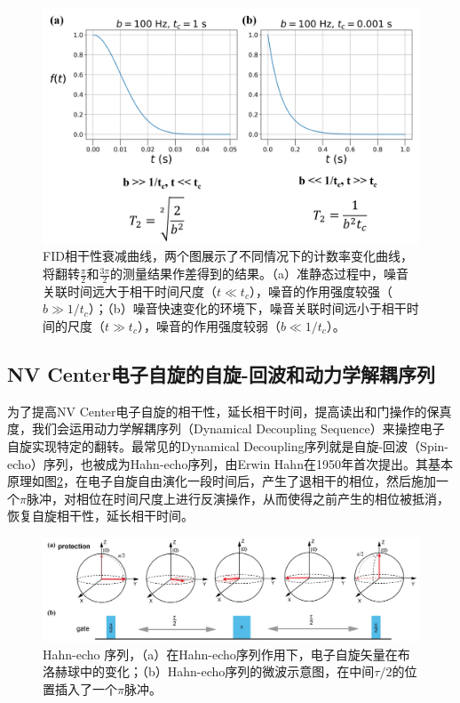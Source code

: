 \documentclass[type = bachelor, oneside]{whu-thesis}
\begin{document}
\begin{figure}
  \centering
  \includegraphics[width=1.0\textwidth]{figures/Chapter 2/FID Functions.png}
  \caption[FID相干性衰减曲线]{FID相干性衰减曲线，两个图展示了不同情况下的计数率变化曲线，将翻转$\frac{\pi}{2}$和$\frac{3\pi}{2}$的测量结果作差得到的结果。（a）准静态过程中，噪音关联时间远大于相干时间尺度（$t\ll t_c$），噪音的作用强度较强（$b\gg 1/t_c$）；（b）噪音快速变化的环境下，噪音关联时间远小于相干时间的尺度（$t\gg t_c$），噪音的作用强度较弱（$b\ll 1/t_c$）。}
  \label{fig: FID Functions}
\end{figure}

\subsection{NV Center电子自旋的自旋-回波和动力学解耦序列}
为了提高NV Center电子自旋的相干性，延长相干时间，提高读出和门操作的保真度，我们会运用动力学解耦序列（Dynamical Decoupling Sequence）来操控电子自旋实现特定的翻转。最常见的Dynamical Decoupling序列就是自旋-回波（Spin-echo）序列，也被成为Hahn-echo序列，由Erwin Hahn在1950年首次提出\cite{Hahn1950}。其基本原理如图\ref{fig: Hahn Sequence}，在电子自旋自由演化一段时间后，产生了退相干的相位，然后施加一个$\pi$脉冲，对相位在时间尺度上进行反演操作，从而使得之前产生的相位被抵消，恢复自旋相干性，延长相干时间。
\begin{figure}
  \centering
  \includegraphics[width=1.0\textwidth]{figures/Chapter 2/Hahn Sequence.png}
  \caption[Hahn-echo 序列]{Hahn-echo 序列，（a）在Hahn-echo序列作用下，电子自旋矢量在布洛赫球中的变化；（b）Hahn-echo序列的微波示意图，在中间$\tau/2$的位置插入了一个$\pi$脉冲。\cite{新型扫描量子传感显微镜系统的研发与应用}}
  \label{fig: Hahn Sequence}
\end{figure}
\end{document}
